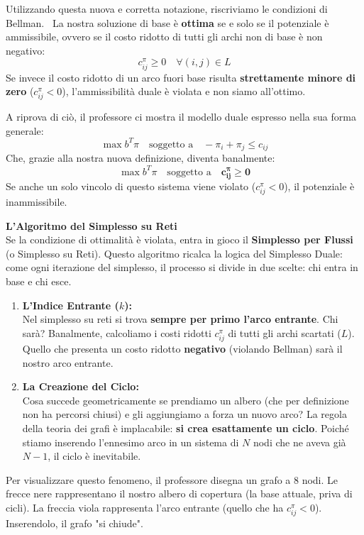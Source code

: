 \documentclass[12pt, a4paper]{article}
\newcommand{\separatore}{\noindent{\color{titlecolor!50}\rule{\textwidth}{0.6pt}}}
\begin{document}
	Utilizzando questa nuova e corretta notazione, riscriviamo le condizioni di Bellman. 
	La nostra soluzione di base è \textbf{ottima} se e solo se il potenziale è ammissibile, ovvero se il costo ridotto di tutti gli archi non di base è non negativo:
	\[
	c_{ij}^\pi \geq 0 \quad \forall (i,j) \in L
	\]
	Se invece il costo ridotto di un arco fuori base risulta \textbf{strettamente minore di zero} ($c_{ij}^\pi < 0$), l'ammissibilità duale è violata e non siamo all'ottimo.
	
	A riprova di ciò, il professore ci mostra il modello duale espresso nella sua forma generale:
	\[
	\max b^T \pi \quad \text{soggetto a} \quad -\pi_i + \pi_j \leq c_{ij}
	\]
	Che, grazie alla nostra nuova definizione, diventa banalmente:
	\[
	\max b^T \pi \quad \text{soggetto a} \quad \mathbf{c_{ij}^\pi \geq 0}
	\]
	Se anche un solo vincolo di questo sistema viene violato ($c_{ij}^\pi < 0$), il potenziale è inammissibile.
	
	\vspace{0.6cm}
	\separatore
	\vspace{0.4cm}
	
	\textbf{L'Algoritmo del Simplesso su Reti}\\
	Se la condizione di ottimalità è violata, entra in gioco il \textbf{Simplesso per Flussi} (o Simplesso su Reti). Questo algoritmo ricalca la logica del Simplesso Duale: come ogni iterazione del simplesso, il processo si divide in due scelte: chi entra in base e chi esce.
	\begin{enumerate}
		\item \textbf{L'Indice Entrante ($k$):}\\
		Nel simplesso su reti si trova \textbf{sempre per primo l'arco entrante}. Chi sarà? Banalmente, calcoliamo i costi ridotti $c_{ij}^\pi$ di tutti gli archi scartati ($L$). Quello che presenta un costo ridotto \textbf{negativo} (violando Bellman) sarà il nostro arco entrante.
		
		\item \textbf{La Creazione del Ciclo:}\\
		Cosa succede geometricamente se prendiamo un albero (che per definizione non ha percorsi chiusi) e gli aggiungiamo a forza un nuovo arco? La regola della teoria dei grafi è implacabile: \textbf{si crea esattamente un ciclo}. Poiché stiamo inserendo l'ennesimo arco in un sistema di $N$ nodi che ne aveva già $N-1$, il ciclo è inevitabile.
	\end{enumerate}
	
	Per visualizzare questo fenomeno, il professore disegna un grafo a 8 nodi. Le frecce nere rappresentano il nostro albero di copertura (la base attuale, priva di cicli). La freccia viola rappresenta l'arco entrante (quello che ha $c_{ij}^\pi < 0$). Inserendolo, il grafo "si chiude".
	
\end{document}
